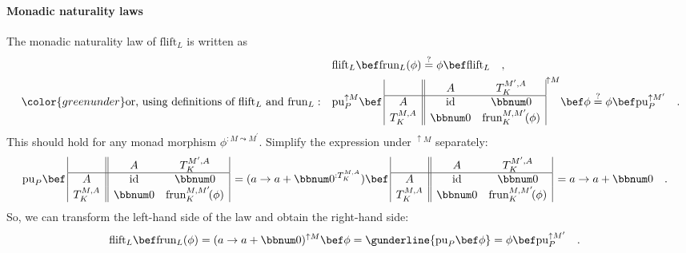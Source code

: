 \paragraph{Monadic naturality laws}

The monadic naturality law of $\text{flift}_{L}$ is written as
\begin{align*}
 & \text{flift}_{L}\bef\text{frun}_{L}(\phi)\overset{?}{=}\phi\bef\text{flift}_{L}\quad,\\
{\color{greenunder}\text{or, using definitions of }\text{flift}_{L}\text{ and }\text{frun}_{L}:}\quad & \text{pu}_{P}^{\uparrow M}\bef\,\begin{array}{|c||cc|}
 & A & T_{K}^{M^{\prime},A}\\
\hline A & \text{id} & \bbnum 0\\
T_{K}^{M,A} & \bbnum 0 & \text{frun}_{K}^{M,M^{\prime}}\!(\phi)
\end{array}^{\uparrow M}\bef\phi\overset{?}{=}\phi\bef\text{pu}_{P}^{\uparrow M^{\prime}}\quad.
\end{align*}
This should hold for any monad morphism $\phi^{:M\leadsto M^{\prime}}$.
Simplify the expression under $^{\uparrow M}$ separately:
\begin{align*}
 & \text{pu}_{P}\bef\,\begin{array}{|c||cc|}
 & A & T_{K}^{M^{\prime},A}\\
\hline A & \text{id} & \bbnum 0\\
T_{K}^{M,A} & \bbnum 0 & \text{frun}_{K}^{M,M^{\prime}}\!(\phi)
\end{array}\,=(a\rightarrow a+\bbnum 0^{:T_{K}^{M,A}})\bef\,\begin{array}{|c||cc|}
 & A & T_{K}^{M^{\prime},A}\\
\hline A & \text{id} & \bbnum 0\\
T_{K}^{M,A} & \bbnum 0 & \text{frun}_{K}^{M,M^{\prime}}\!(\phi)
\end{array}\,=a\rightarrow a+\bbnum 0\quad.
\end{align*}
So, we can transform the left-hand side of the law and obtain the
right-hand side:
\begin{align*}
 & \text{flift}_{L}\bef\text{frun}_{L}(\phi)=(a\rightarrow a+\bbnum 0)^{\uparrow M}\bef\phi=\gunderline{\text{pu}_{P}\bef\phi}=\phi\bef\text{pu}_{P}^{\uparrow M^{\prime}}\quad.
\end{align*}

